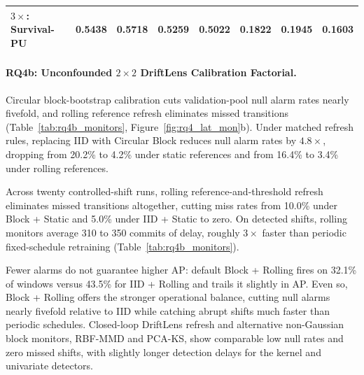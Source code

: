 \documentclass[pdflatex,sn-basic]{sn-jnl}
\theoremstyle{definition}
\theoremstyle{plain}
\begin{document}
\begin{table}[t]
\begin{tabular*}{\textwidth}{@{\extracolsep\fill}lccccccc@{}}
$3\times$: Survival-PU & 0.5438 & 0.5718 & \textbf{0.5259} & \textbf{0.5022} & 0.1822 & \textbf{0.1945} & \textbf{0.1603} \\
\bottomrule
\end{tabular*}
\vspace{2pt}\par{}
\end{table}

\paragraph{RQ4b: Unconfounded $2 \times 2$ DriftLens Calibration Factorial.}
Circular block-bootstrap calibration cuts validation-pool null alarm rates nearly fivefold, and rolling reference refresh eliminates missed transitions (Table~\ref{tab:rq4b_monitors}, Figure~\ref{fig:rq4_lat_mon}b). Under matched refresh rules, replacing IID with Circular Block reduces null alarm rates by $4.8\times$, dropping from 20.2\% to 4.2\% under static references and from 16.4\% to 3.4\% under rolling references.

Across twenty controlled-shift runs, rolling reference-and-threshold refresh eliminates missed transitions altogether, cutting miss rates from 10.0\% under Block + Static and 5.0\% under IID + Static to zero. On detected shifts, rolling monitors average 310 to 350 commits of delay, roughly $3\times$ faster than periodic fixed-schedule retraining (Table~\ref{tab:rq4b_monitors}).

Fewer alarms do not guarantee higher AP: default Block + Rolling fires on 32.1\% of windows versus 43.5\% for IID + Rolling and trails it slightly in AP. Even so, Block + Rolling offers the stronger operational balance, cutting null alarms nearly fivefold relative to IID while catching abrupt shifts much faster than periodic schedules. Closed-loop DriftLens refresh and alternative non-Gaussian block monitors, RBF-MMD and PCA-KS, show comparable low null rates and zero missed shifts, with slightly longer detection delays for the kernel and univariate detectors.
\end{document}
